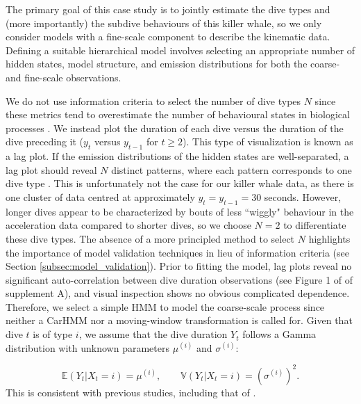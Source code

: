 The primary goal of this case study is to jointly estimate the dive types and (more importantly) the subdive behaviours of this killer whale, so we only consider models with a fine-scale component to describe the kinematic data. Defining a suitable hierarchical model involves selecting an appropriate number of hidden states, model structure, and emission distributions for both the coarse- and fine-scale observations.

We do not use information criteria to select the number of dive types $N$ since these metrics tend to overestimate the number of behavioural states in biological processes \citep{Pohle:2017}. We instead plot the duration of each dive versus the duration of the dive preceding it ($y_t$ versus $y_{t-1}$ for $t \geq 2$). This type of visualization is known as a lag plot. If the emission distributions of the hidden states are well-separated, a lag plot should reveal $N$ distinct patterns, where each pattern corresponds to one dive type \citep{Lawler:2019}. This is unfortunately not the case for our killer whale data, as there is one cluster of data centred at approximately $y_t = y_{t-1} = 30$ seconds. However, longer dives appear to be characterized by bouts of less ``wiggly" behaviour in the acceleration data compared to shorter dives, so we choose $N = 2$ to differentiate these dive types. The absence of a more principled method to select $N$ highlights the importance of model validation techniques in lieu of information criteria (see Section \ref{subsec:model_validation}).
%
Prior to fitting the model, lag plots reveal no significant auto-correlation between dive duration observations (see Figure 1 of of supplement A), and visual inspection shows no obvious complicated dependence. Therefore, we select a simple HMM to model the coarse-scale process since neither a CarHMM nor a moving-window transformation is called for.
%
Given that dive $t$ is of type $i$, we assume that the dive duration $Y_t$ follows a Gamma distribution with unknown parameters $\mu^{(i)}$ and $\sigma^{(i)}$:

\[\mathbb{E}(Y_t|X_t = i) = \mu^{(i)}, \qquad \mathbb{V}(Y_t|X_t = i) = \left(\sigma^{(i)}\right)^2.\]
%
This is consistent with previous studies, including that of \citet{Barajas:2017}. 
%

